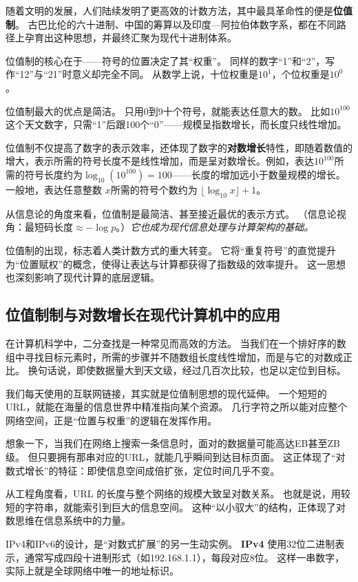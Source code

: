 随着文明的发展，人们陆续发明了更高效的计数方法，其中最具革命性的便是{\bf 位值制}。  
古巴比伦的六十进制、中国的筹算以及印度—阿拉伯体数字系，都在不同路径上孕育出这种思想，并最终汇聚为现代十进制体系。

位值制的核心在于——符号的位置决定了其“权重”。  
同样的数字“1”和“2”，写作“12”与“21”时意义却完全不同。  
从数学上说，十位权重是$10^1$，个位权重是$10^0$。

位值制最大的优点是简洁。 
只用0到9十个符号，就能表达任意大的数。  
比如$10^{100}$这个天文数字，只需“1”后跟100个“0”——规模呈指数增长，而长度只线性增加。

位值制不仅提高了数字的表示效率，还体现了数字的{\bf 对数增长}特性，即随着数值的增大，表示所需的符号长度不是线性增加，而是呈对数增长。例如，表达$10^{100}$所需的符号长度约为$\log_{10}(10^{100})=100$——长度的增加远小于数量规模的增长。
一般地，表达任意整数 $x$所需的符号个数约为 $\lfloor \log_{10} x \rfloor + 1$。 

从信息论的角度来看，位值制是最简洁、甚至接近最优的表示方式。  
{（信息论视角：最短码长度$\approx -\log p$。）}\emph{它也成为现代信息处理与计算架构的基础。}  

位值制的出现，标志着人类计数方式的重大转变。  
它将“重复符号”的直觉提升为“位置赋权”的概念，使得让表达与计算都获得了指数级的效率提升。  
这一思想也深刻影响了现代计算的底层逻辑。  

\subsection{位值制制与对数增长在现代计算机中的应用}
  
在计算机科学中，二分查找是一种常见而高效的方法。  
当我们在一个排好序的数组中寻找目标元素时，所需的步骤并不随数组长度线性增加，而是与它的对数成正比。  
换句话说，即使数据量大到天文级，经过几百次比较，也足以定位到目标。  

我们每天使用的互联网链接，其实就是位值制思想的现代延伸。  
一个短短的URL，就能在海量的信息世界中精准指向某个资源。  
几行字符之所以能对应整个网络空间，正是“位置与权重”的逻辑在发挥作用。
  

想象一下，当我们在网络上搜索一条信息时，面对的数据量可能高达EB甚至ZB级。  
但只要拥有那串对应的URL，就能几乎瞬间到达目标页面。  
这正体现了“对数式增长”的特征：即使信息空间成倍扩张，定位时间几乎不变。

从工程角度看，URL 的长度与整个网络的规模大致呈对数关系。  
也就是说，用较短的字符串，就能索引到巨大的信息空间。  
这种“以小驭大”的结构，正体现了对数思维在信息系统中的力量。

IPv4和IPv6的设计，是“对数式扩展”的另一生动实例。  
{\bf IPv4} 使用32位二进制表示，通常写成四段十进制形式（如192.168.1.1），每段对应8位。  这样一串数字，实际上就是全球网络中唯一的地址标识。

